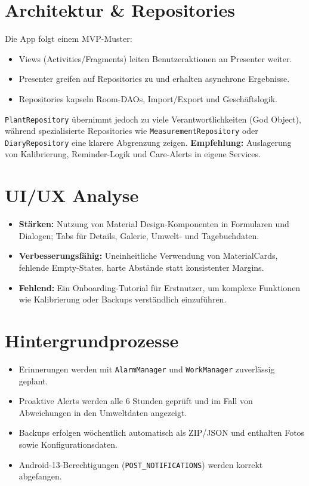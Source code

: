 \documentclass[14pt,a4paper]{report}
\begin{document}
\section{Architektur \& Repositories}
Die App folgt einem MVP-Muster: 
\begin{itemize}
    \item Views (Activities/Fragments) leiten Benutzeraktionen an Presenter weiter.
    \item Presenter greifen auf Repositories zu und erhalten asynchrone Ergebnisse.
    \item Repositories kapseln Room-DAOs, Import/Export und Geschäftslogik.
\end{itemize}
\texttt{PlantRepository} übernimmt jedoch zu viele Verantwortlichkeiten (God Object), während spezialisierte Repositories wie \texttt{MeasurementRepository} oder \texttt{DiaryRepository} eine klarere Abgrenzung zeigen.  
\textbf{Empfehlung:} Auslagerung von Kalibrierung, Reminder-Logik und Care-Alerts in eigene Services.

\section{UI/UX Analyse}
\begin{itemize}
    \item \textbf{Stärken:} Nutzung von Material Design-Komponenten in Formularen und Dialogen; Tabs für Details, Galerie, Umwelt- und Tagebuchdaten.
    \item \textbf{Verbesserungsfähig:} Uneinheitliche Verwendung von MaterialCards, fehlende Empty-States, harte Abstände statt konsistenter Margins.
    \item \textbf{Fehlend:} Ein Onboarding-Tutorial für Erstnutzer, um komplexe Funktionen wie Kalibrierung oder Backups verständlich einzuführen.
\end{itemize}

\section{Hintergrundprozesse}
\begin{itemize}
    \item Erinnerungen werden mit \texttt{AlarmManager} und \texttt{WorkManager} zuverlässig geplant.
    \item Proaktive Alerts werden alle 6 Stunden geprüft und im Fall von Abweichungen in den Umweltdaten angezeigt.
    \item Backups erfolgen wöchentlich automatisch als ZIP/JSON und enthalten Fotos sowie Konfigurationsdaten.
    \item Android-13-Berechtigungen (\texttt{POST\_NOTIFICATIONS}) werden korrekt abgefangen.
\end{itemize}
\end{document}
